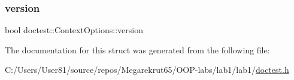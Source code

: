 \mbox{\label{structdoctest_1_1_context_options_a08931527a9e5e634e64a336e5493a7c1}} 
\subsubsection{\texorpdfstring{version}{version}}
{\footnotesize\ttfamily bool doctest\+::\+Context\+Options\+::version}



The documentation for this struct was generated from the following file\+:\begin{DoxyCompactItemize}
\item 
C\+:/\+Users/\+User81/source/repos/\+Megarekrut65/\+O\+O\+P-\/labs/lab1/lab1/\mbox{\hyperlink{doctest_8h}{doctest.\+h}}\end{DoxyCompactItemize}
